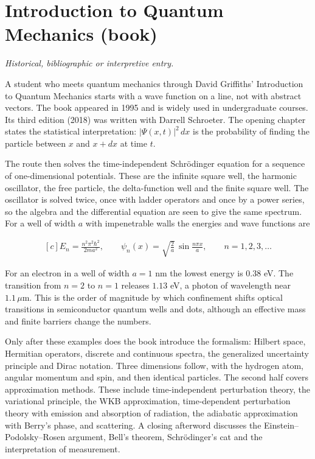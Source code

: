 \documentclass[11pt,oneside]{book}
\newenvironment{centeredalign}{\[\begin{gathered}[c]}{\end{gathered}\]}
\begin{document}
\clearpage

\section{Introduction to Quantum Mechanics (book)}

\label{topic:introduction-to-quantum-mechanics-book}

\par\smallskip\noindent\textit{Historical, bibliographic or interpretive entry.}

A student who meets quantum mechanics through David Griffiths' Introduction to Quantum Mechanics starts with a wave function on a line, not with abstract vectors. The book appeared in 1995 and is widely used in undergraduate courses. Its third edition (2018) was written with Darrell Schroeter. The opening chapter states the statistical interpretation: \(|\Psi(x,t)|^2\,dx\) is the probability of finding the particle between \(x\) and \(x+dx\) at time \(t\).

The route then solves the time-independent Schrödinger equation for a sequence of one-dimensional potentials. These are the infinite square well, the harmonic oscillator, the free particle, the delta-function well and the finite square well. The oscillator is solved twice, once with ladder operators and once by a power series, so the algebra and the differential equation are seen to give the same spectrum. For a well of width \(a\) with impenetrable walls the energies and wave functions are

\begin{centeredalign}
E_n=\frac{n^2\pi^2\hbar^2}{2ma^2},\qquad
\psi_n(x)=\sqrt{\frac{2}{a}}\,\sin\frac{n\pi x}{a},\qquad n=1,2,3,\dots
\end{centeredalign}

For an electron in a well of width \(a=1\) nm the lowest energy is \(0.38\) eV. The transition from \(n=2\) to \(n=1\) releases \(1.13\) eV, a photon of wavelength near \(1.1\,\mu\mathrm{m}\). This is the order of magnitude by which confinement shifts optical transitions in semiconductor quantum wells and dots, although an effective mass and finite barriers change the numbers.

Only after these examples does the book introduce the formalism: Hilbert space, Hermitian operators, discrete and continuous spectra, the generalized uncertainty principle and Dirac notation. Three dimensions follow, with the hydrogen atom, angular momentum and spin, and then identical particles. The second half covers approximation methods. These include time-independent perturbation theory, the variational principle, the WKB approximation, time-dependent perturbation theory with emission and absorption of radiation, the adiabatic approximation with Berry's phase, and scattering. A closing afterword discusses the Einstein--Podolsky--Rosen argument, Bell's theorem, Schrödinger's cat and the interpretation of measurement.
\end{document}
